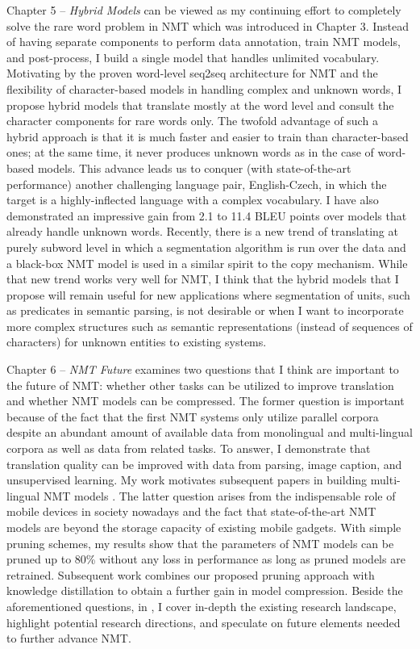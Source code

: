 Chapter 5 -- {\it Hybrid Models} can be viewed as my continuing effort to
completely solve the rare word problem in NMT which was introduced in Chapter 3.
Instead of having separate components to perform data annotation, train NMT
models, and post-process, I build a single model that handles unlimited
vocabulary. Motivating by the proven word-level seq2seq architecture for NMT and
the flexibility of character-based models in handling complex and unknown words,
I propose hybrid models that translate mostly at the word level and consult the
character components for rare words only. The twofold advantage of such a hybrid
approach is that it is much faster and easier to train than character-based
ones; at the same time, it never produces unknown words as in the case of
word-based models. This advance leads us to conquer (with state-of-the-art
performance) another challenging language pair, English-Czech, in which the
target is a highly-inflected language with a complex vocabulary. I have also
demonstrated an impressive gain from 2.1 to 11.4 BLEU points over models that
already handle unknown words. Recently, there is a new trend of translating at
purely subword level \cite{sennrich16sub,gnmt16} in which a segmentation
algorithm is run over the data and a black-box NMT model is used in a similar
spirit to the copy mechanism. While that new trend works very well for NMT, I
think that the hybrid models that I propose will remain useful for new
applications where segmentation of units, such as predicates in semantic
parsing, is not desirable or when I want to incorporate more complex structures
such as semantic representations (instead of sequences of characters) for
unknown entities to existing systems.

Chapter 6 -- {\it NMT Future} examines two questions that I think are important
to the future of NMT: whether other tasks can be utilized to improve translation
and whether NMT models can be compressed. The former question is important
because of the fact that the first NMT systems only utilize parallel corpora
despite an abundant amount of available data from monolingual and multi-lingual
corpora as well as data from related tasks. To answer, I demonstrate that
translation quality can be improved with data from parsing, image caption, and
unsupervised learning. My work motivates subsequent papers in building
multi-lingual NMT models \cite{zoph16,firat16,gnmt16multi,ha16}. The latter
question arises from the indispensable role of mobile devices in society
nowadays and the fact that state-of-the-art NMT models are beyond the storage
capacity of existing mobile gadgets. With simple pruning schemes, my results
show that the parameters of NMT models can be pruned up to 80\% without any loss
in performance as long as pruned models are retrained. Subsequent work
\cite{kim16distill} combines our proposed pruning approach with knowledge
distillation to obtain a further gain in model compression. Beside the
aforementioned questions, in , I cover in-depth the existing
research landscape, highlight potential research directions, and speculate on
future elements needed to further advance NMT.

